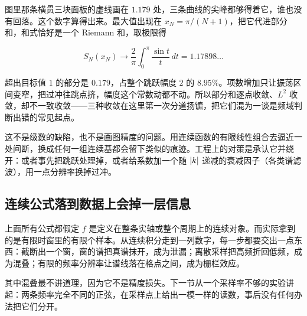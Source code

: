图里那条横贯三块面板的虚线画在 \(1.179\) 处，三条曲线的尖峰都够得着它，谁也没有回落。这个数字算得出来。最大值出现在 \(x_N=\pi/(N+1)\)，把它代进部分和，和式恰好是一个 Riemann 和，取极限得

\[
S_N(x_N)\longrightarrow\frac{2}{\pi}\int_0^{\pi}\frac{\sin t}{t}\,dt=1.17898\ldots
\]

超出目标值 \(1\) 的部分是 \(0.179\)，占整个跳跃幅度 \(2\) 的 \(8.95\%\)。项数增加只让振荡区间变窄，把过冲往跳点挤，幅度这个常数动都不动。所以部分和逐点收敛、\(L^2\) 收敛，却不一致收敛——三种收敛在这里第一次分道扬镳，把它们混为一谈是频域判断出错的常见起点。

这不是级数的缺陷，也不是画图精度的问题。用连续函数的有限线性组合去逼近一处间断，换成任何一组连续基都会留下类似的痕迹。工程上的对策是承认它并绕开：或者事先把跳跃处理掉，或者给系数加一个随 \(\left|k\right|\) 递减的衰减因子（各类谱滤波），用一点分辨率换掉过冲。

\subsection{连续公式落到数据上会掉一层信息}

上面所有公式都假定 \(f\) 是定义在整条实轴或整个周期上的连续对象。而实际拿到的是有限时窗里的有限个样本。从连续积分走到一列数字，每一步都要交出一点东西：截断出一个窗，窗的谱把真谱抹开，成为泄漏；离散采样把高频折回低频，成为混叠；有限的频率分辨率让谱线落在格点之间，成为栅栏效应。

其中混叠最不讲道理，因为它不是精度损失。下一节从一个采样率不够的实验讲起：两条频率完全不同的正弦，在采样点上给出一模一样的读数，事后没有任何办法把它们分开。
